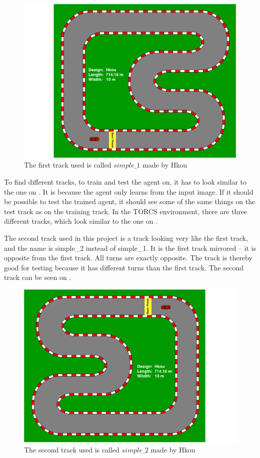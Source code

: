 \begin{figure}[H]
	\centering
	\includegraphics[width=1\textwidth]{Figures/Result/track_simple_1.pdf}
	\caption{The first track used is called $simple\_1$ made by Hkou}
	\label{fig:track_simple_1}
\end{figure}

To find different tracks, to train and test the agent on, it has to look similar to the one on . It is because the agent only learns from the input image. If it should be possible to test the trained agent, it should see some of the same things on the test track as on the training track. In the TORCS environment, there are three different tracks, which look similar to the one on . 

The second track used in this project is a track looking very like the first track, and the name is simple\_2 instead of simple\_1. It is the first track mirrored – it is opposite from the first track. All turns are exactly opposite. The track is thereby good for testing because it has different turns than the first track. The second track can be seen on . 

\begin{figure}[H]
	\centering
	\includegraphics[width=1\textwidth]{Figures/Result/track_simple_2.pdf}
	\caption{The second track used is called $simple\_2$ made by Hkou}
	\label{fig:track_simple_2}
\end{figure}

